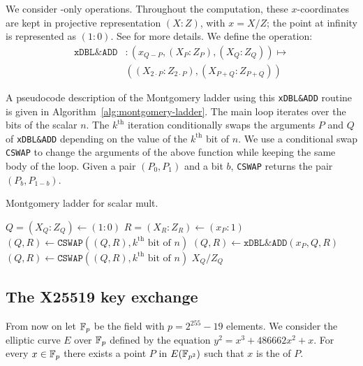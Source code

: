 We consider \xcoord-only operations. Throughout the computation,
these $x$-coordinates are kept in projective representation
$(X : Z)$, with $x = X/Z$; the point at infinity is represented as $(1:0)$.
See  for more details.
We define the operation:
\begin{align*}
  \texttt{xDBL\&ADD} & : (x_{Q-P}, (X_P:Z_P), (X_Q:Z_Q)) \mapsto              \\[-0.5ex]
                     & ((X_{2 \cdot P}:Z_{2 \cdot P}), (X_{P + Q}:Z_{P + Q}))
\end{align*}

A pseudocode description of the Montgomery ladder using this \texttt{xDBL\&ADD} routine
is given in Algorithm~\ref{alg:montgomery-ladder}.
The main loop iterates over the bits of the scalar $n$.
The $k^{\text{th}}$ iteration conditionally swaps
the arguments $P$ and $Q$ of \texttt{xDBL\&ADD}
depending on the value of the $k^{\text{th}}$ bit of $n$.
We use a conditional swap \texttt{CSWAP} to change the arguments of the above
function while keeping the same body of the loop. \label{cswap}
Given a pair $(P_0, P_1)$ and a bit $b$, \texttt{CSWAP} returns the pair
$(P_b, P_{1-b})$.

\begin{algorithm}
  \caption{Montgomery ladder for scalar mult.}
  \label{alg:montgomery-ladder}
  \begin{algorithmic}
    \STATE $Q = (X_Q:Z_Q) \leftarrow (1:0)$
    \STATE $R = (X_R:Z_R) \leftarrow (x_P:1)$
    \STATE $(Q,R) \leftarrow \texttt{CSWAP}((Q,R), k^{\text{th}}\text{ bit of }n)$
    \STATE $(Q,R) \leftarrow \texttt{xDBL\&ADD}(x_P,Q,R)$
    \STATE $(Q,R) \leftarrow \texttt{CSWAP}((Q,R), k^{\text{th}}\text{ bit of }n)$
    \ENDFOR
    \RETURN $X_Q/Z_Q$
  \end{algorithmic}
\end{algorithm}

\subsection{The X25519 key exchange}
\label{subsec:X25519-key-exchange}

From now on let $\mathbb{F}_{p}$ be the field with $p=2^{255}-19$ elements.
We consider the elliptic curve $E$ over $\mathbb{F}_{p}$ defined by the
equation $y^2 = x^3 + 486662 x^2 + x$.
For every $x \in \mathbb{F}_{p}$ there exists a point $P$ in $E(\mathbb{F}_{p^2})$
such that $x$ is the \xcoord of $P$.

